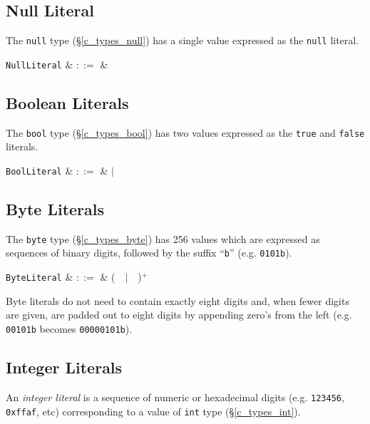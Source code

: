 \subsection{Null Literal}

The \lstinline{null} type (\S\ref{c_types_null}) has a single value expressed as the \lstinline{null} literal.

\begin{syntax}
  \verb+NullLiteral+ & $::=$ &  \\
\end{syntax}


\subsection{Boolean Literals}

The \lstinline{bool} type (\S\ref{c_types_bool}) has two values expressed as the \lstinline{true} and \lstinline{false} literals.

\begin{syntax}
  \verb+BoolLiteral+ & $::=$ &  $|$  \\
\end{syntax}


\subsection{Byte Literals}

The \lstinline{byte} type (\S\ref{c_types_byte}) has 256 values which are expressed as sequences of binary digits, followed by the suffix ``\lstinline{b}'' (e.g. \lstinline{0101b}).


\begin{syntax}
 \verb+ByteLiteral+ & $::=$ & \big(\ \ $|$\ \ \big)$^+$\ \\
\end{syntax}

Byte literals do not need to contain exactly eight digits and, when fewer digits are given, are padded out to eight digits by appending zero's from the left (e.g. \lstinline{00101b} becomes \lstinline{00000101b}).


\subsection{Integer Literals}

An {\em integer literal} is a sequence of numeric or hexadecimal digits (e.g. \lstinline{123456}, \lstinline{0xffaf}, etc) corresponding to a value of \lstinline{int} type (\S\ref{c_types_int}).

